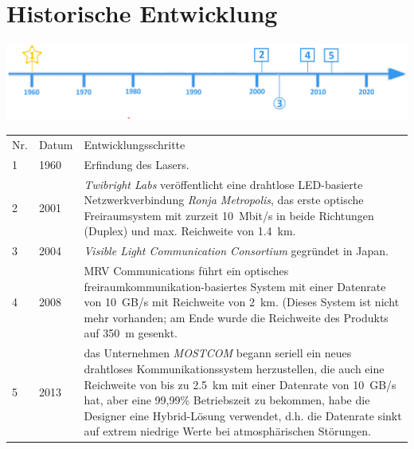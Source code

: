 \section*{Historische Entwicklung}
\includegraphics[width=\textwidth]{Kapitel/Laserlink/Grafiken/Zeitstrahl}
\par
\noindent
{}
\begin{tabular}{p{0.5 cm}p{3 cm}p{13.55 cm}}
	Nr. & Datum & Entwicklungsschritte\\
	1 &  1960 & Erfindung des Lasers. ~\cite{Laserlink.5}\\
	2 & 2001 & \textit{Twibright Labs} veröffentlicht eine drahtlose LED-basierte Netzwerkverbindung \textit{Ronja Metropolis}, das erste optische Freiraumsystem mit zurzeit \SI{10}{Mbit/s} in beide Richtungen (Duplex) und max. Reichweite von \SI{1,4}{\kilo\metre}.~\cite{Laserlink.5}\\
	3 & 2004 & \textit{Visible Light Communication Consortium} gegründet in Japan.~\cite{Laserlink.5}\\
	4 & 2008 & MRV Communications führt ein optisches freiraumkommunikation-basiertes System mit einer Datenrate von \SI{10}{GB/s} mit Reichweite von \SI{2}{\kilo\metre}. (Dieses System ist nicht mehr vorhanden; am Ende wurde die Reichweite des Produkts auf \SI{350}{\metre} gesenkt.~\cite{Laserlink.5}\\
	5 &  2013 &  das Unternehmen \textit{MOSTCOM} begann seriell ein neues drahtloses Kommunikationssystem herzustellen, die auch eine Reichweite von bis zu \SI{2,5}{\kilo\metre} mit einer Datenrate von \SI{10}{GB/s} hat, aber eine 99,99\% Betriebszeit zu bekommen, habe die Designer eine Hybrid-Lösung verwendet, d.h. die Datenrate sinkt auf extrem niedrige Werte bei atmosphärischen Störungen.~\cite{Laserlink.5}\\
\end{tabular}
\par

